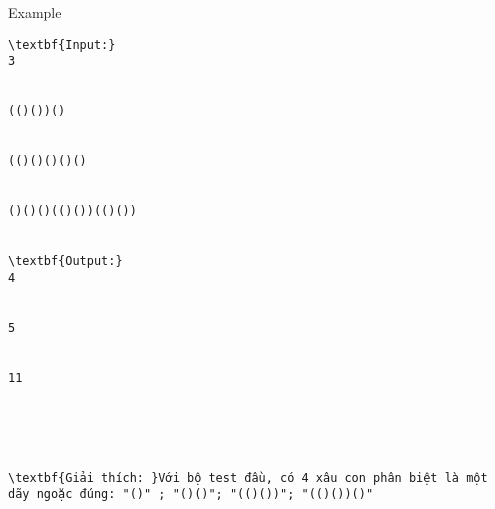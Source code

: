 Example
\begin{verbatim}
\textbf{Input:}
3


(()())()


(()()()()()


()()()(()())(()())


\textbf{Output:}
4


5


11





\textbf{Giải thích: }Với bộ test đầu, có 4 xâu con phân biệt là một dãy ngoặc đúng: "()" ; "()()"; "(()())"; "(()())()"


\end{verbatim}